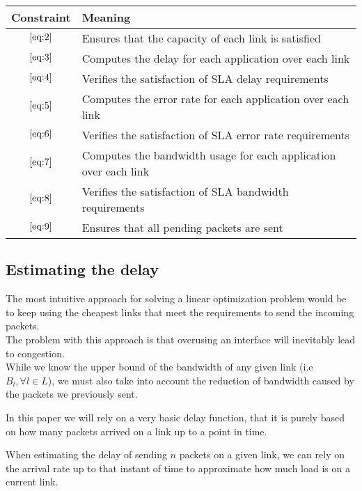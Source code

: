 	\begin{center}
	\begin{table}[htb]
		\centering
		\makegapedcells
		\begin{tabular}{|c|p{9cm}|}
			\hline
			Constraint  & Meaning \\ \hline
			$\eqref{eq:2}$ & Ensures that the capacity of each link is satisfied  \\ \hline
			$\eqref{eq:3}$ & Computes the delay for each application over each link \\ \hline
			$\eqref{eq:4}$ & Verifies the satisfaction of SLA delay requirements  \\ \hline
			$\eqref{eq:5}$ & Computes the error rate for each application over each link  \\ \hline
			$\eqref{eq:6}$ & Verifies the satisfaction of SLA error rate requirements  \\ \hline
			$\eqref{eq:7}$ & Computes the bandwidth usage for each application over each link  \\ \hline
			$\eqref{eq:8}$ & Verifies the satisfaction of SLA bandwidth requirements  \\ \hline
			$\eqref{eq:9}$ & Ensures that all pending packets are sent  \\ \hline
		\end{tabular}
	\end{table}
\end{center}




\subsection{Estimating the delay} \label{estimating_the_delay}

The most intuitive approach for solving a linear optimization problem would be to keep using the cheapest links that meet the requirements to send the incoming packets. \\
The problem with this approach is that overusing an interface will inevitably lead to congestion. \\ While we know the upper bound of the bandwidth of any given link (i.e $B_l, \forall l \in L$), we must also take into account the reduction of bandwidth caused by the packets we previously sent.

In this paper we will rely on a very basic delay function, that it is purely based on how many packets arrived on a link up to a point in time.

When estimating the delay of sending $n$ packets on a given link, we can rely on the arrival rate up to that instant of time to approximate how much load is on a current link.

